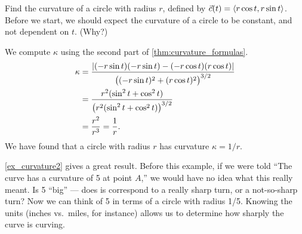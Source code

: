 \begin{example}\label{ex_curvature2}%
Find the curvature of a circle with radius $r$, defined by $\vec c(t) =\left\langle r\cos t,r\sin t\right\rangle$.
\solution
Before we start, we should expect the curvature of a circle to be constant, and not dependent on $t$. (Why?)

We compute $\kappa$ using the second part of \autoref{thm:curvature_formulas}.
\begin{align*}
	\kappa
	&= \frac{\abs{(-r\sin t)(-r\sin t) - (-r\cos t)(r\cos t)}}{\bigl( (-r\sin t)^2+(r\cos t)^2\bigr)^{3/2}} \smallskip\\
	&= \frac{r^2(\sin^2t+\cos^2t)}{\bigl(r^2(\sin^2t+\cos^2t)\bigr)^{3/2}}\smallskip\\
	&= \frac{r^2}{r^3} = \frac1r.
\end{align*}
We have found that a circle with radius $r$ has curvature $\kappa = 1/r$.
\end{example}

\autoref{ex_curvature2} gives a great result. Before this example, if we were told ``The curve has a curvature of 5 at point $A$,'' we would have no idea what this really meant. Is 5 ``big'' --- does is correspond to a really sharp turn, or a not-so-sharp turn? Now we can think of 5 in terms of a circle with radius 1/5. Knowing the units (inches vs.\ miles, for instance) allows us to determine how sharply the curve is curving.\bigskip

